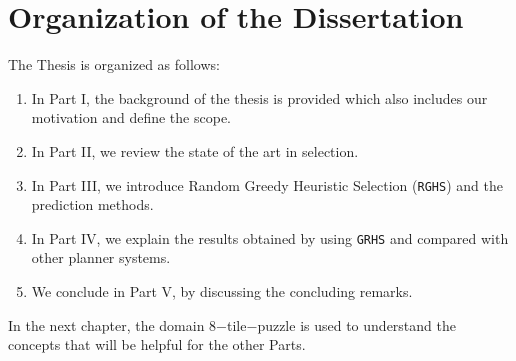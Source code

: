\section{Organization of the Dissertation}
\noindent
The Thesis is organized as follows: 
\begin{enumerate}
\item In Part I, the background of the thesis is provided which also includes our motivation and define the scope. 
\item In Part II, we review the state of the art in selection.
\item In Part III, we introduce Random Greedy Heuristic Selection (\texttt{RGHS}) and the prediction methods. 
\item In Part IV, we explain the results obtained by using \texttt{GRHS} and compared with other planner systems. 
\item We conclude in Part V, by discussing the concluding remarks.
\end{enumerate}

In the next chapter, the domain 8$-$tile$-$puzzle is used to understand the concepts that will be helpful for the other Parts. \\

\clearpage